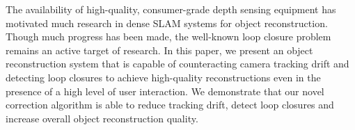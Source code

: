 The availability of high-quality, consumer-grade depth sensing equipment has motivated much research in dense SLAM systems for
object reconstruction. Though much progress has been made, the well-known loop closure problem remains an active target of research.
In this paper, we present an object reconstruction system that is capable of counteracting camera tracking drift and detecting loop
closures to achieve high-quality reconstructions even in the presence of a high level of user interaction.
We demonstrate that our novel correction algorithm is able to reduce tracking drift, detect loop closures and increase overall
object reconstruction quality.